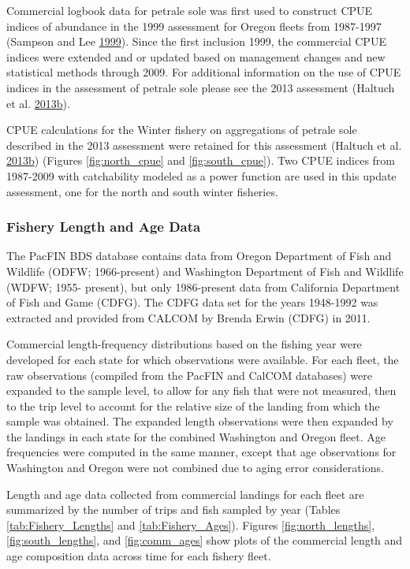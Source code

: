 \documentclass[12pt,]{article}
\begin{document}
Commercial logbook data for petrale sole was first used to construct
CPUE indices of abundance in the 1999 assessment for Oregon fleets from
1987-1997 (Sampson and Lee
\protect\hyperlink{ref-sampson_assessment_1999}{1999}). Since the first
inclusion 1999, the commercial CPUE indices were extended and or updated
based on management changes and new statistical methods through 2009.
For additional information on the use of CPUE indices in the assessment
of petrale sole please see the 2013 assessment (Haltuch et al.
\protect\hyperlink{ref-haltuch_status_2013}{2013}\protect\hyperlink{ref-haltuch_status_2013}{b}).

CPUE calculations for the Winter fishery on aggregations of petrale sole
described in the 2013 assessment were retained for this assessment
(Haltuch et al.
\protect\hyperlink{ref-haltuch_status_2013}{2013}\protect\hyperlink{ref-haltuch_status_2013}{b})
(Figures \ref{fig:north_cpue} and \ref{fig:south_cpue}). Two CPUE
indices from 1987-2009 with catchability modeled as a power function are
used in this update assessment, one for the north and south winter
fisheries.

\subsubsection{Fishery Length and Age
Data}\label{fishery-length-and-age-data}

The PacFIN BDS database contains data from Oregon Department of Fish and
Wildlife (ODFW; 1966-present) and Washington Department of Fish and
Wildlife (WDFW; 1955- present), but only 1986-present data from
California Department of Fish and Game (CDFG). The CDFG data set for the
years 1948-1992 was extracted and provided from CALCOM by Brenda Erwin
(CDFG) in 2011.

Commercial length-frequency distributions based on the fishing year were
developed for each state for which observations were available. For each
fleet, the raw observations (compiled from the PacFIN and CalCOM
databases) were expanded to the sample level, to allow for any fish that
were not measured, then to the trip level to account for the relative
size of the landing from which the sample was obtained. The expanded
length observations were then expanded by the landings in each state for
the combined Washington and Oregon fleet. Age frequencies were computed
in the same manner, except that age observations for Washington and
Oregon were not combined due to aging error considerations.

Length and age data collected from commercial landings for each fleet
are summarized by the number of trips and fish sampled by year (Tables
\ref{tab:Fishery_Lengths} and \ref{tab:Fishery_Ages}). Figures
\ref{fig:north_lengths}, \ref{fig:south_lengths}, and
\ref{fig:comm_ages} show plots of the commercial length and age
composition data across time for each fishery fleet.
\end{document}
